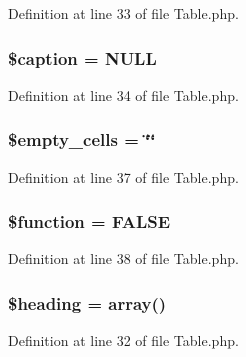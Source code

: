 Definition at line 33 of file Table.\-php.

\hypertarget{class_c_i___table_a4f9340ccb02c5d876a448a1d860f3812}{
\subsubsection[{\$caption}]{\setlength{\rightskip}{0pt plus 5cm}\$caption = N\-U\-L\-L}}\label{class_c_i___table_a4f9340ccb02c5d876a448a1d860f3812}


Definition at line 34 of file Table.\-php.

\hypertarget{class_c_i___table_aeba996c863f9ba0e2c9e24d0491bb976}{
\subsubsection[{\$empty\-\_\-cells}]{\setlength{\rightskip}{0pt plus 5cm}\$empty\-\_\-cells = \char`\"{}\char`\"{}}}\label{class_c_i___table_aeba996c863f9ba0e2c9e24d0491bb976}


Definition at line 37 of file Table.\-php.

\hypertarget{class_c_i___table_af3e5d0d1ff43879d493dd97bb760c479}{
\subsubsection[{\$function}]{\setlength{\rightskip}{0pt plus 5cm}\$function = F\-A\-L\-S\-E}}\label{class_c_i___table_af3e5d0d1ff43879d493dd97bb760c479}


Definition at line 38 of file Table.\-php.

\hypertarget{class_c_i___table_a196169be7715d466e3310388b096598c}{
\subsubsection[{\$heading}]{\setlength{\rightskip}{0pt plus 5cm}\$heading = array()}}\label{class_c_i___table_a196169be7715d466e3310388b096598c}


Definition at line 32 of file Table.\-php.


